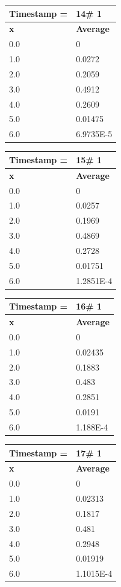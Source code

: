 \begin{tabular}{|l||l|}
\hline
\textbf{Timestamp =} & \textbf{14}\# 1\\\hline
	\textbf{x} & \textbf{Average} \\ \hline
\hline
	0.0 & 0 \\ \hline
	1.0 & 0.0272 \\ \hline
	2.0 & 0.2059 \\ \hline
	3.0 & 0.4912 \\ \hline
	4.0 & 0.2609 \\ \hline
	5.0 & 0.01475 \\ \hline
	6.0 & 6.9735E-5 \\ \hline
\end{tabular}
\begin{tabular}{|l||l|}
\hline
\textbf{Timestamp =} & \textbf{15}\# 1\\\hline
	\textbf{x} & \textbf{Average} \\ \hline
\hline
	0.0 & 0 \\ \hline
	1.0 & 0.0257 \\ \hline
	2.0 & 0.1969 \\ \hline
	3.0 & 0.4869 \\ \hline
	4.0 & 0.2728 \\ \hline
	5.0 & 0.01751 \\ \hline
	6.0 & 1.2851E-4 \\ \hline
\end{tabular}

\begin{tabular}{|l||l|}
\hline
\textbf{Timestamp =} & \textbf{16}\# 1\\\hline
	\textbf{x} & \textbf{Average} \\ \hline
\hline
	0.0 & 0 \\ \hline
	1.0 & 0.02435 \\ \hline
	2.0 & 0.1883 \\ \hline
	3.0 & 0.483 \\ \hline
	4.0 & 0.2851 \\ \hline
	5.0 & 0.0191 \\ \hline
	6.0 & 1.188E-4 \\ \hline
\end{tabular}
\begin{tabular}{|l||l|}
\hline
\textbf{Timestamp =} & \textbf{17}\# 1\\\hline
	\textbf{x} & \textbf{Average} \\ \hline
\hline
	0.0 & 0 \\ \hline
	1.0 & 0.02313 \\ \hline
	2.0 & 0.1817 \\ \hline
	3.0 & 0.481 \\ \hline
	4.0 & 0.2948 \\ \hline
	5.0 & 0.01919 \\ \hline
	6.0 & 1.1015E-4 \\ \hline
\end{tabular}

